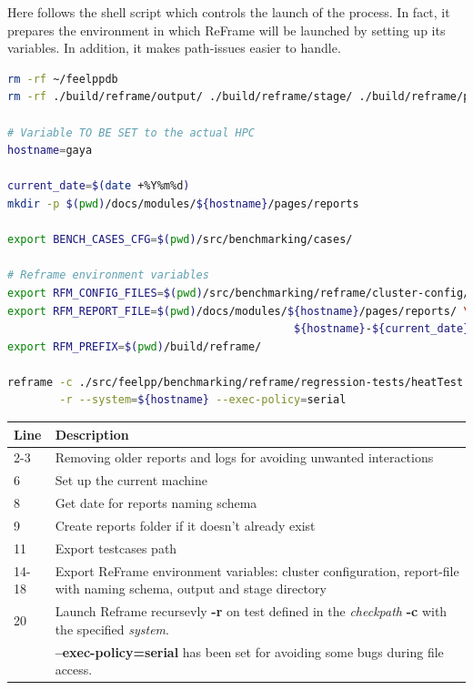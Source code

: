 \documentclass[12pt]{article}
\begin{document}
Here follows the shell script which controls the launch of the process. In fact, it prepares the environment in which ReFrame will be launched by setting up its variables.
In addition, it makes path-issues easier to handle.\\

\begin{lstlisting}[language=bash,caption={Script for process launching}]
rm -rf ~/feelppdb
rm -rf ./build/reframe/output/ ./build/reframe/stage/ ./build/reframe/perflogs

# Variable TO BE SET to the actual HPC
hostname=gaya

current_date=$(date +%Y%m%d)
mkdir -p $(pwd)/docs/modules/${hostname}/pages/reports

export BENCH_CASES_CFG=$(pwd)/src/benchmarking/cases/

# Reframe environment variables
export RFM_CONFIG_FILES=$(pwd)/src/benchmarking/reframe/cluster-config/${hostname}.py
export RFM_REPORT_FILE=$(pwd)/docs/modules/${hostname}/pages/reports/ \
                                            ${hostname}-${current_date}-{sessionid}.json
export RFM_PREFIX=$(pwd)/build/reframe/

reframe -c ./src/feelpp/benchmarking/reframe/regression-tests/heatTest.py \
        -r --system=${hostname} --exec-policy=serial
\end{lstlisting}

\begin{tabular}{|l|m{14cm}|}
\hline
\textbf{Line} & \textbf{Description} \\
\hline
2-3  & Removing older reports and logs for avoiding unwanted interactions \\
\hline
6    & Set up the current machine \\
\hline
8    & Get date for reports naming schema \\
\hline
9    & Create reports folder if it doesn't already exist \\
\hline
11   & Export testcases path \\
\hline
14-18   & Export ReFrame environment variables: cluster configuration, report-file with naming schema, output and stage directory\\
\hline
20   & Launch Reframe recursevly \textbf{-r} on test defined in the \textit{checkpath} \textbf{-c} with the specified \textit{system}.\\
     & \textbf{--exec-policy=serial} has been set for avoiding some bugs during file access. \\
\hline
\end{tabular}
\end{document}
